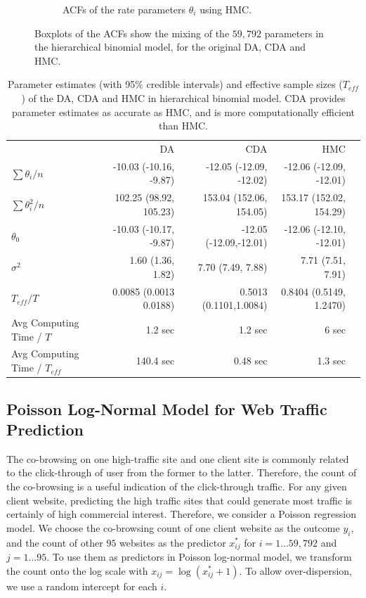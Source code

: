 \documentclass[10pt]{article}
\begin{document}
\begin{figure}[H]
\begin{subfigure}[b]{0.32\textwidth}
 \caption{ACFs of the rate parameters $\theta_i$ using HMC.}
 \end{subfigure} 
 \caption{Boxplots of the ACFs show the mixing of the $59,792$ parameters in the hierarchical binomial model, for the original DA\citep{polson2013bayesian}, CDA and HMC.}
 \label{data_binomial}
 \end{figure}
 
 
 
\begin{table}[H]
\centering
\begin{tabular}{|l |r |r| r| r |} 
 \hline
                          & DA & CDA & HMC\\
 [0.5ex]

 $ \sum \theta_i/n$      & -10.03 (-10.16, -9.87)& -12.05 (-12.09, -12.02) &  -12.06 (-12.09, -12.01)\\
 $ \sum \theta_i^2/n$      & 102.25 (98.92, 105.23)& 153.04 (152.06, 154.05) &  153.17 (152.02, 154.29)\\
$\theta_0$          & -10.03 (-10.17, -9.87)& -12.05 (-12.09,-12.01) &  -12.06 (-12.10, -12.01)\\
$\sigma^2$         & 1.60 (1.36, 1.82)&   7.70 (7.49, 7.88)  & 7.71 (7.51, 7.91)\\
$T_{eff} / T$ & 0.0085 (0.0013 0.0188) & 0.5013 (0.1101,1.0084) & 0.8404 (0.5149, 1.2470)\\
Avg Computing Time /  $T$  & 1.2 sec       & 1.2 sec        & 6 sec\\
Avg Computing Time /  $T_{eff}$  & 140.4 sec       & 0.48 sec        & 1.3 sec\\
 \hline
\end{tabular}
\caption{Parameter estimates (with 95\% credible intervals) and effective sample sizes ($T_{eff}$) of the DA, CDA and HMC in hierarchical binomial model. CDA provides parameter estimates as accurate as HMC, and is more computationally efficient than HMC.}
\label{tab:binomial}
\end{table}


\subsection{Poisson Log-Normal Model for Web Traffic Prediction}

The co-browsing on one high-traffic site and one client site is commonly related to the click-through of user from the former to the latter. Therefore, the count of the co-browsing is a useful indication of the click-through traffic. For any given client website, predicting the high traffic sites that could generate most traffic is certainly of high commercial interest. Therefore, we consider a Poisson regression model. We choose the co-browsing count of one client website as the outcome $y_i$, and the count of other $95$ websites as the predictor $x^*_{ij}$ for $i=1\ldots 59,792$ and $j=1\ldots 95$. To use them as predictors in Poisson log-normal model, we transform the count onto the log scale with $x_{ij}=\log (x^*_{ij}+1)$. To allow over-dispersion, we use a random intercept for each $i$.
\end{document}
